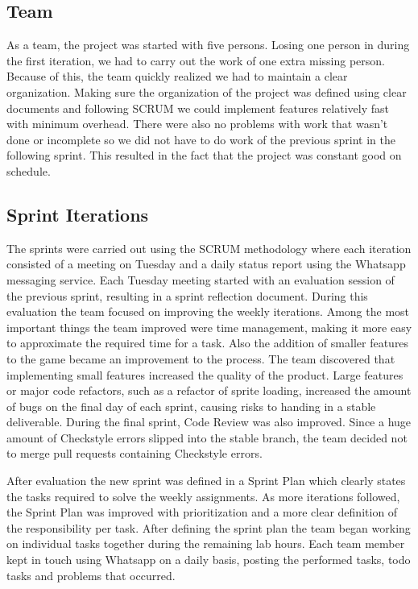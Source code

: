\documentclass[10pt]{article}
\begin{document}
\subsection*{Team}
As a team, the project was started with five persons. Losing one person in during the first iteration, we had to carry out the work of one extra missing person. Because of this, the team quickly realized we had to maintain a clear organization. Making sure the organization of the project was defined using clear documents and following SCRUM we could implement features relatively fast with minimum overhead. There were also no problems with work that wasn't done or incomplete so we did not have to do work of the previous sprint in the following sprint. This resulted in the fact that the project was constant good on schedule.

\subsection*{Sprint Iterations}
The sprints were carried out using the SCRUM methodology where each iteration consisted of a meeting on Tuesday and a daily status report using the Whatsapp messaging service. Each Tuesday meeting started with an evaluation session of the previous sprint, resulting in a sprint reflection document. 
During this evaluation the team focused on improving the weekly iterations. Among the most important things the team improved were time management, making it more easy to approximate the required time for a task. Also the addition of smaller features to the game became an improvement to the process. The team discovered that implementing small features increased the quality of the product. Large features or major code refactors, such as a refactor of sprite loading, increased the amount of bugs on the final day of each sprint, causing risks to handing in a stable deliverable. During the final sprint, Code Review was also improved. Since a huge amount of Checkstyle errors slipped into the stable branch, the team decided not to merge pull requests containing Checkstyle errors.

After evaluation the new sprint was defined in a Sprint Plan which clearly states the tasks required to solve the weekly assignments. As more iterations followed, the Sprint Plan was improved with prioritization and a more clear definition of the responsibility per task. After defining the sprint plan the team began working on individual tasks together during the remaining lab hours. Each team member kept in touch using Whatsapp on a daily basis, posting the performed tasks, todo tasks and problems that occurred. 
\end{document}
